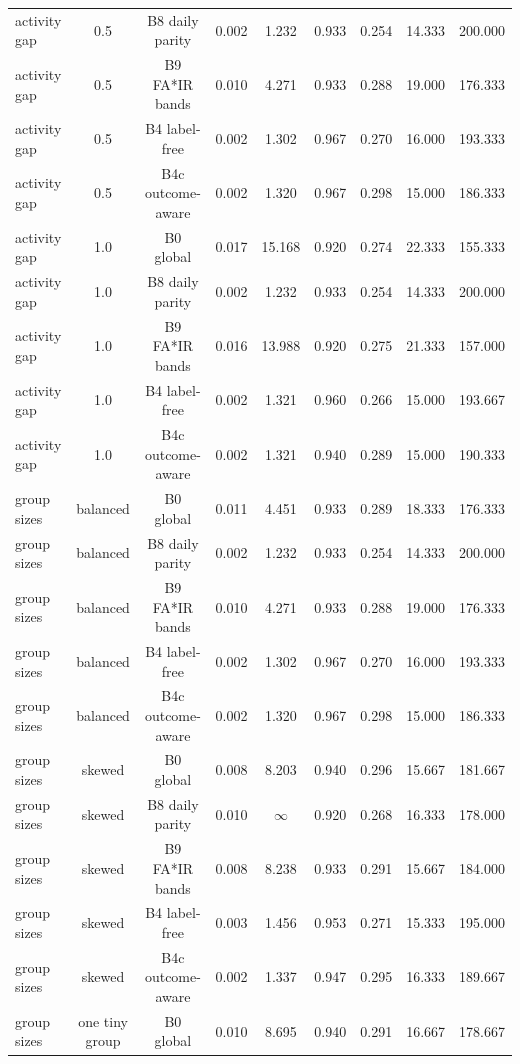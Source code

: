 \documentclass[10pt,onecolumn,letterpaper]{article}
\begin{document}
\begin{table}[!t]
{\begin{tabular}{lcccccccc}
activity gap & 0.5 & B8 daily parity & 0.002 & 1.232 & 0.933 & 0.254 & 14.333 & 200.000 \\
activity gap & 0.5 & B9 FA*IR bands & 0.010 & 4.271 & 0.933 & 0.288 & 19.000 & 176.333 \\
activity gap & 0.5 & B4 label-free & 0.002 & 1.302 & 0.967 & 0.270 & 16.000 & 193.333 \\
activity gap & 0.5 & B4c outcome-aware & 0.002 & 1.320 & 0.967 & 0.298 & 15.000 & 186.333 \\
activity gap & 1.0 & B0 global & 0.017 & 15.168 & 0.920 & 0.274 & 22.333 & 155.333 \\
activity gap & 1.0 & B8 daily parity & 0.002 & 1.232 & 0.933 & 0.254 & 14.333 & 200.000 \\
activity gap & 1.0 & B9 FA*IR bands & 0.016 & 13.988 & 0.920 & 0.275 & 21.333 & 157.000 \\
activity gap & 1.0 & B4 label-free & 0.002 & 1.321 & 0.960 & 0.266 & 15.000 & 193.667 \\
activity gap & 1.0 & B4c outcome-aware & 0.002 & 1.321 & 0.940 & 0.289 & 15.000 & 190.333 \\
group sizes & balanced & B0 global & 0.011 & 4.451 & 0.933 & 0.289 & 18.333 & 176.333 \\
group sizes & balanced & B8 daily parity & 0.002 & 1.232 & 0.933 & 0.254 & 14.333 & 200.000 \\
group sizes & balanced & B9 FA*IR bands & 0.010 & 4.271 & 0.933 & 0.288 & 19.000 & 176.333 \\
group sizes & balanced & B4 label-free & 0.002 & 1.302 & 0.967 & 0.270 & 16.000 & 193.333 \\
group sizes & balanced & B4c outcome-aware & 0.002 & 1.320 & 0.967 & 0.298 & 15.000 & 186.333 \\
group sizes & skewed & B0 global & 0.008 & 8.203 & 0.940 & 0.296 & 15.667 & 181.667 \\
group sizes & skewed & B8 daily parity & 0.010 & $\infty$ & 0.920 & 0.268 & 16.333 & 178.000 \\
group sizes & skewed & B9 FA*IR bands & 0.008 & 8.238 & 0.933 & 0.291 & 15.667 & 184.000 \\
group sizes & skewed & B4 label-free & 0.003 & 1.456 & 0.953 & 0.271 & 15.333 & 195.000 \\
group sizes & skewed & B4c outcome-aware & 0.002 & 1.337 & 0.947 & 0.295 & 16.333 & 189.667 \\
group sizes & one tiny group & B0 global & 0.010 & 8.695 & 0.940 & 0.291 & 16.667 & 178.667 \\

\end{tabular}}
\end{table}
\end{document}
